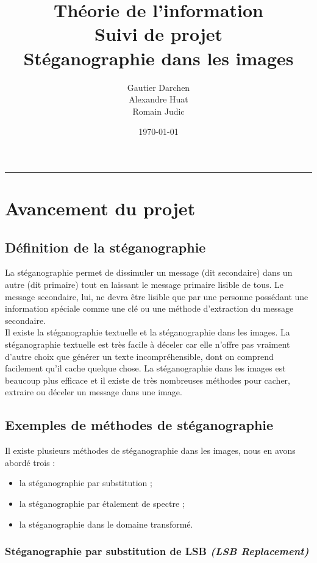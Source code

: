 \documentclass[11pt]{article}
\title{Théorie de l'information\\
	Suivi de projet\\
	Stéganographie dans les images}
\author{Gautier Darchen \\ Alexandre Huat \\ Romain Judic}
\date{\today}
\begin{document}
\maketitle
\noindent\rule{\textwidth}{1.3pt}

\section{Avancement du projet}

\subsection{Définition de la stéganographie}
La stéganographie permet de dissimuler un message (dit secondaire) dans un autre (dit primaire) tout en laissant le message primaire lisible de tous. Le message secondaire, lui, ne devra être lisible que par une personne possédant une information spéciale comme une clé ou une méthode d'extraction du message secondaire.\\

Il existe la stéganographie textuelle et la stéganographie dans les images. La stéganographie textuelle est très facile à déceler car elle n'offre pas vraiment d'autre choix que générer un texte incompréhensible, dont on comprend facilement qu'il cache quelque chose. La stéganographie dans les images est beaucoup plus efficace et il existe de très nombreuses méthodes pour cacher, extraire ou déceler un message dans une image\cite{VariousStego}.

\subsection{Exemples de méthodes de stéganographie}
Il existe plusieurs méthodes de stéganographie dans les images, nous en avons abordé trois :
\begin{itemize}
\item la stéganographie par substitution ;
\item la stéganographie par étalement de spectre ;
\item la stéganographie dans le domaine transformé.
\end{itemize}

\subsubsection{Stéganographie par substitution de LSB \emph{(LSB Replacement)}\cite{CoursUM2,Zath,PrincipMax}} %

\end{document}
